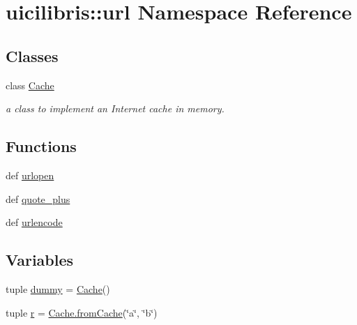 \hypertarget{namespaceuicilibris_1_1url}{\section{uicilibris\-:\-:url \-Namespace \-Reference}
\label{namespaceuicilibris_1_1url}
}
\subsection*{\-Classes}
\begin{DoxyCompactItemize}
\item 
class \hyperlink{classuicilibris_1_1url_1_1Cache}{\-Cache}
\begin{DoxyCompactList}\small\item\em a class to implement an \-Internet cache in memory. \end{DoxyCompactList}\end{DoxyCompactItemize}
\subsection*{\-Functions}
\begin{DoxyCompactItemize}
\item 
def \hyperlink{namespaceuicilibris_1_1url_a9a556c026bd6f16226eae700752c26bc}{urlopen}
\item 
def \hyperlink{namespaceuicilibris_1_1url_a91be4b2ed2f528dd20fd0fb6a05ec150}{quote\-\_\-plus}
\item 
def \hyperlink{namespaceuicilibris_1_1url_ad2f0ef3aaa21f23b2848873801562127}{urlencode}
\end{DoxyCompactItemize}
\subsection*{\-Variables}
\begin{DoxyCompactItemize}
\item 
tuple \hyperlink{namespaceuicilibris_1_1url_a50d38be5c987d58533d81c4fff2a7399}{dummy} = \hyperlink{classuicilibris_1_1url_1_1Cache}{\-Cache}()
\item 
tuple \hyperlink{namespaceuicilibris_1_1url_a155704e52ad5847cafb65b87e5df100a}{r} = \hyperlink{classuicilibris_1_1url_1_1Cache_a756831fa5c88a681e1826010156fe03e}{\-Cache.\-from\-Cache}(\char`\"{}a\char`\"{}, \char`\"{}b\char`\"{})
\end{DoxyCompactItemize}


